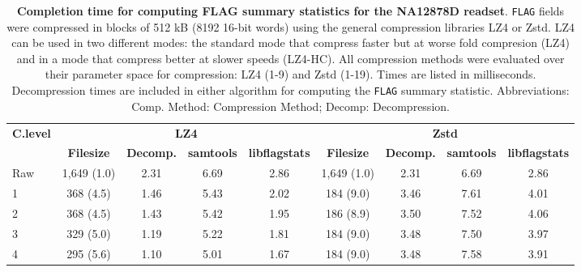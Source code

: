 \begin{table}[]
\centering
\caption{\textbf{Completion time for computing FLAG summary statistics for the NA12878D readset}. \texttt{FLAG}
fields were compressed in blocks of 512 kB (8192 16-bit words) using the general
compression libraries LZ4 or Zstd. LZ4 can be used in two different modes: the
standard mode that compress faster but at worse fold compresion (LZ4) and in a
mode that compress better at slower speeds (LZ4-HC). All compression methods
were evaluated over their parameter space for compression: LZ4 (1-9) and Zstd
(1-19). Times are listed in milliseconds. Decompression times are included in
either algorithm for computing the \texttt{FLAG} summary statistic. Abbreviations: Comp. Method:
Compression Method; Decomp: Decompression.}
\label{tab:NA12878D-perf}
\begin{tabular}{|l|c|c|c|c|c|c|c|c|}
\hline
\multirow{2}{*}{\textbf{C.level}} & \multicolumn{4}{c|}{\textbf{LZ4}}                                                   & \multicolumn{4}{c|}{\textbf{Zstd}}                                                  \\ \cline{2-9} 
                                      & \textbf{Filesize} & \textbf{Decomp.} & \textbf{samtools} & \textbf{libflagstats} & \textbf{Filesize} & \textbf{Decomp.} & \textbf{samtools} & \textbf{libflagstats} \\ \hline
Raw                                   & 1,649 (1.0)       & 2.31                & 6.69              & 2.86                  & 1,649 (1.0)       & 2.31                & 6.69              & 2.86                  \\ \hline
1                                     & 368 (4.5)         & 1.46                & 5.43              & 2.02                  & 184 (9.0)         & 3.46                & 7.61              & 4.01                  \\ \hline
2                                     & 368 (4.5)         & 1.43                & 5.42              & 1.95                  & 186 (8.9)         & 3.50                & 7.52              & 4.06                  \\ \hline
3                                     & 329 (5.0)         & 1.19                & 5.22              & 1.81                  & 184 (9.0)         & 3.48                & 7.50              & 3.97                  \\ \hline
4                                     & 295 (5.6)         & 1.10                & 5.01              & 1.67                  & 184 (9.0)         & 3.48                & 7.58              & 3.91                  \\ \hline

\end{tabular}
\end{table}
